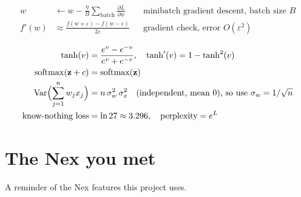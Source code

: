 \documentclass[11pt,a4paper,oneside,openany]{book}
\newcommand{\vect}[1]{\mathbf{#1}}
\newcommand{\pd}[2]{\frac{\partial #1}{\partial #2}}
\begin{document}
\begin{mathbox}[Training]
\begin{align*}
  w &\leftarrow w - \frac{\eta}{B}\sum_{\text{batch}}\pd{L}{w}
    && \text{minibatch gradient descent, batch size } B\\
  f'(w) &\approx \frac{f(w+\varepsilon) - f(w-\varepsilon)}{2\varepsilon}
    && \text{gradient check, error } O(\varepsilon^2)
\end{align*}
\end{mathbox}

\begin{mathbox}
\begin{align*}
  \tanh(v) &= \frac{e^{v} - e^{-v}}{e^{v} + e^{-v}}, \quad \tanh'(v) = 1 - \tanh^2(v) \\
  \operatorname{softmax}(\vect{z} + c) &= \operatorname{softmax}(\vect{z}) \\
  \operatorname{Var}\Bigl(\sum_{j=1}^{n} w_j x_j\Bigr) &= n\,\sigma_w^2\,\sigma_x^2
     \quad\text{(independent, mean 0), so use } \sigma_w = 1/\sqrt{n} \\
  \text{know-nothing loss} &= \ln 27 \approx 3.296, \quad
  \text{perplexity} = e^{L}
\end{align*}
\end{mathbox}

\chapter{The Nex you met}

A reminder of the Nex features this project uses.
\end{document}
